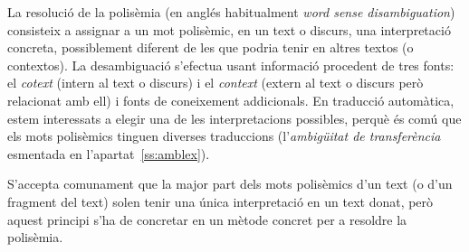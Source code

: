 
La resolució de la polisèmia (en anglés habitualment \emph{word sense
  disambiguation}) consisteix a assignar a un mot polisèmic, en un
text o discurs, una interpretació concreta, possiblement diferent de
les que podria tenir en altres textos (o contextos). La desambiguació
s'efectua usant informació procedent de tres fonts: el \emph{cotext}
(intern al text o discurs) i el \emph{context} (extern al text o
discurs però relacionat amb ell) i fonts de coneixement addicionals.
En traducció automàtica, estem interessats a elegir una de les
interpretacions possibles, perquè és comú que els mots polisèmics
tinguen diverses traduccions (l'\emph{ambigüitat de transferència}
esmentada en l'apartat~\ref{ss:amblex}).

S'accepta comunament que la major part dels mots polisèmics d'un text
(o d'un fragment del text) solen tenir una única interpretació en un
text donat, però aquest principi s'ha de concretar en un mètode
concret per a resoldre la polisèmia.
 
